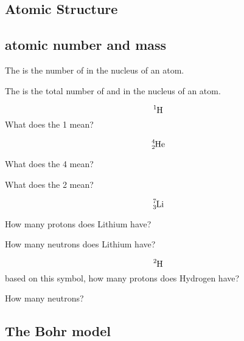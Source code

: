 \documentclass[12pt]{exam}
\begin{document}
\twocolumn
    
\begin{questions}
        
\section{Atomic Structure}

\subsection{atomic number and mass}

\question The  is the number of \fillin[protons][3cm] in the nucleus of an atom.

\question The  is the total number of \fillin[protons][2cm] and \fillin[neutrons][2cm]in the nucleus of an atom.



\question $$\ce{^{1}_{}H}$$
What does the 1 mean?

\fillwithlines{2cm}


\question $$\ce{^{4}_{2}He}$$

\question What does the 4 mean? 

\fillwithlines{1cm}

\question What does the 2 mean?
\fillwithlines{1cm}

\question $$\ce{^{7}_{3}Li}$$

How many protons does Lithium have? \fillin[3][2cm]

How many neutrons does Lithium have? \fillin[4][2cm]

\question $$\ce{^{2}_{}H}$$ based on this symbol, how many protons does Hydrogen have? \fillin[1][1cm]

How many neutrons? \fillin[1][1cm]

\vspace{3cm}

\subsection{The Bohr model}

\end{questions}
\end{document}
